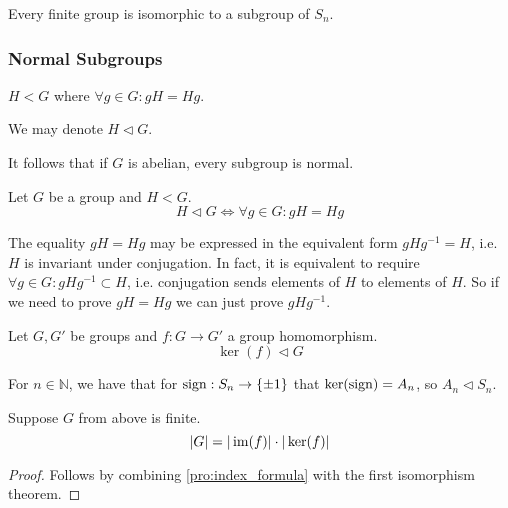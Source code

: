 \begin{proposition}
   Every finite group is isomorphic to a subgroup of \(S_n\).
\end{proposition}

\subsubsection{Normal Subgroups}
\begin{definition}
   \(H < G\) where \(\forall g \in G: gH = Hg\).
\end{definition}
\begin{remark}[Notation]
   We may denote \(H \triangleleft G\).
\end{remark}
\begin{remark}
   It follows that if \(G\) is abelian, every subgroup is normal.
\end{remark}

\begin{proposition}
   Let \(G\) be a group and \(H < G\).
   \[H \triangleleft G \iff \forall g \in G: gH = Hg\]
\end{proposition}

\begin{remark}
   The equality \(gH = Hg\) may be expressed in the equivalent form \(gHg^{-1} = H\), i.e. \(H\) is invariant under conjugation.
   In fact, it is equivalent to require \(\forall g \in G: gHg^{-1} \subset H\), i.e. conjugation sends elements of \(H\) to elements of \(H\).
   So if we need to prove \(gH = Hg\) we can just prove \(gHg^{-1}\).
\end{remark}

\begin{proposition}\label{pro:ker_subgrp}
   Let \(G, G'\) be groups and \(f: G \to G'\) a group homomorphism.
   \[\ker(f) \triangleleft G\]
\end{proposition}
\begin{example}
   For \(n \in \mathbb{N}\), we have that for \(\operatorname{sign}: S_n \to \{\pm 1\}\) that \(\ker(\operatorname{sign}) = A_n\), so \(A_n \triangleleft S_n\).
\end{example}

\begin{corollary}
   Suppose \(G\) from above is finite.
   \[|G| = |\operatorname{im}(f)| \cdot |\ker(f)|\]
\end{corollary}
\begin{proof}
   Follows by combining \cref{pro:index_formula} with the first isomorphism theorem.
\end{proof}

